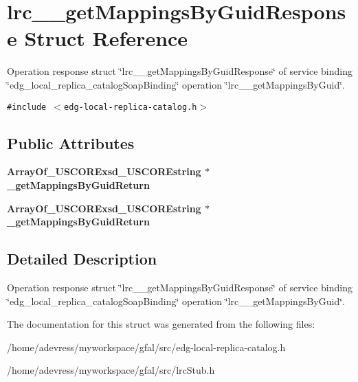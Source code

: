\section{lrc\_\-\_\-get\-Mappings\-By\-Guid\-Response Struct Reference}
\label{structlrc____getMappingsByGuidResponse}
Operation response struct \char`\"{}lrc\_\-\_\-get\-Mappings\-By\-Guid\-Response\char`\"{} of service binding \char`\"{}edg\_\-local\_\-replica\_\-catalog\-Soap\-Binding\char`\"{} operation \char`\"{}lrc\_\-\_\-get\-Mappings\-By\-Guid\char`\"{}.  


{\tt \#include $<$edg-local-replica-catalog.h$>$}

\subsection*{Public Attributes}
\begin{CompactItemize}
\item 
\bf{Array\-Of\_\-USCORExsd\_\-USCOREstring} $\ast$ \textbf{\_\-get\-Mappings\-By\-Guid\-Return}\label{structlrc____getMappingsByGuidResponse_f90e22a9987e1a9b6e77a67a0a4d529c}

\item 
\bf{Array\-Of\_\-USCORExsd\_\-USCOREstring} $\ast$ \textbf{\_\-get\-Mappings\-By\-Guid\-Return}\label{structlrc____getMappingsByGuidResponse_f90e22a9987e1a9b6e77a67a0a4d529c}

\end{CompactItemize}


\subsection{Detailed Description}
Operation response struct \char`\"{}lrc\_\-\_\-get\-Mappings\-By\-Guid\-Response\char`\"{} of service binding \char`\"{}edg\_\-local\_\-replica\_\-catalog\-Soap\-Binding\char`\"{} operation \char`\"{}lrc\_\-\_\-get\-Mappings\-By\-Guid\char`\"{}. 



The documentation for this struct was generated from the following files:\begin{CompactItemize}
\item 
/home/adevress/myworkspace/gfal/src/edg-local-replica-catalog.h\item 
/home/adevress/myworkspace/gfal/src/lrc\-Stub.h\end{CompactItemize}
